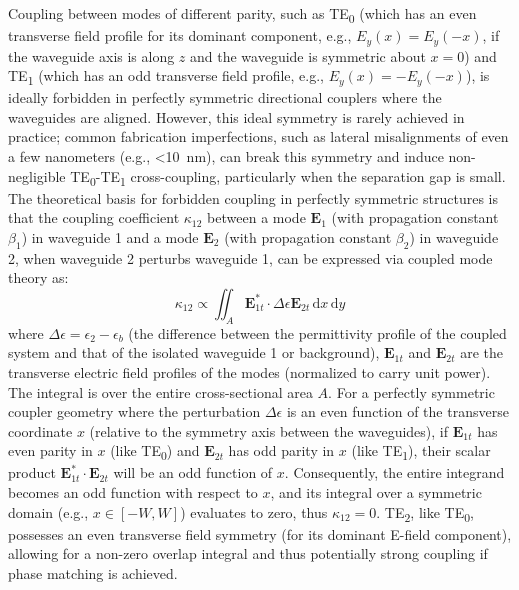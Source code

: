 \documentclass[10pt, a4paper]{article}
\begin{document}
Coupling between modes of different parity, such as TE\textsubscript{0} (which has an even transverse field profile for its dominant component, e.g., \(E_y(x) = E_y(-x)\), if the waveguide axis is along \(z\) and the waveguide is symmetric about \(x=0\)) and TE\textsubscript{1} (which has an odd transverse field profile, e.g., \(E_y(x) = -E_y(-x)\)), is ideally forbidden in perfectly symmetric directional couplers where the waveguides are aligned. However, this ideal symmetry is rarely achieved in practice; common fabrication imperfections, such as lateral misalignments of even a few nanometers (e.g., <10~nm), can break this symmetry and induce non-negligible TE\textsubscript{0}-TE\textsubscript{1} cross-coupling, particularly when the separation gap is small.
The theoretical basis for forbidden coupling in perfectly symmetric structures is that the coupling coefficient \(\kappa_{12}\) between a mode \(\mathbf{E}_1\) (with propagation constant \(\beta_1\)) in waveguide 1 and a mode \(\mathbf{E}_2\) (with propagation constant \(\beta_2\)) in waveguide 2, when waveguide 2 perturbs waveguide 1, can be expressed via coupled mode theory as:
\begin{equation}
  \kappa_{12} \propto\iint_{A} \mathbf{E}_{1t}^* \cdot \Delta\epsilon \mathbf{E}_{2t} \,\mathrm{d}x\,\mathrm{d}y
  \label{eq:kappa_integral}
\end{equation}
where \(\Delta\epsilon=\epsilon_2 - \epsilon_b\) (the difference between the permittivity profile of the coupled system and that of the isolated waveguide 1 or background), \(\mathbf{E}_{1t}\) and \(\mathbf{E}_{2t}\) are the transverse electric field profiles of the modes (normalized to carry unit power). The integral is over the entire cross-sectional area \(A\).
For a perfectly symmetric coupler geometry where the perturbation \(\Delta\epsilon\) is an even function of the transverse coordinate \(x\) (relative to the symmetry axis between the waveguides), if \(\mathbf{E}_{1t}\) has even parity in \(x\) (like TE\textsubscript{0}) and \(\mathbf{E}_{2t}\) has odd parity in \(x\) (like TE\textsubscript{1}), their scalar product \(\mathbf{E}_{1t}^* \cdot \mathbf{E}_{2t}\) will be an odd function of \(x\). Consequently, the entire integrand becomes an odd function with respect to \(x\), and its integral over a symmetric domain (e.g., \(x \in [-W, W]\)) evaluates to zero, thus \(\kappa_{12} = 0\).
TE\textsubscript{2}, like TE\textsubscript{0}, possesses an even transverse field symmetry (for its dominant E-field component), allowing for a non-zero overlap integral and thus potentially strong coupling if phase matching is achieved.
\end{document}
